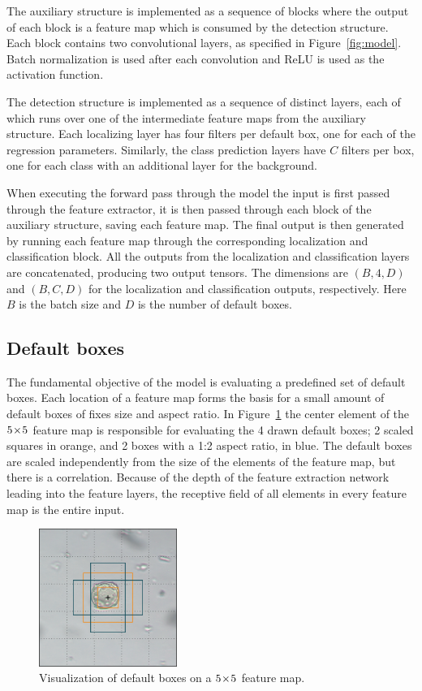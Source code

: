 The auxiliary structure is implemented as a sequence of blocks where the output of each block is a feature map which is consumed by the detection structure.
Each block contains two convolutional layers, as specified in Figure~\ref{fig:model}.
Batch normalization is used after each convolution and ReLU is used as the activation function.

The detection structure is implemented as a sequence of distinct layers, each of which runs over one of the intermediate feature maps from the auxiliary structure.
Each localizing layer has four filters per default box, one for each of the regression parameters.
Similarly, the class prediction layers have \(C\) filters per box, one for each class with an additional layer for the background.

When executing the forward pass through the model the input is first passed through the feature extractor, it is then passed through each block of the auxiliary structure, saving each feature map.
The final output is then generated by running each feature map through the corresponding localization and classification block.
All the outputs from the localization and classification layers are concatenated, producing two output tensors.
The dimensions are \(\left(B,4,D\right) \) and \(\left(B,C,D\right) \) for the localization and classification outputs, respectively.
Here \(B\) is the batch size and \(D\) is the number of default boxes.

\subsection{Default boxes}

The fundamental objective of the model is evaluating a predefined set of default boxes.
Each location of a feature map forms the basis for a small amount of default boxes of fixes size and aspect ratio.
In Figure~\ref{fig:defaults} the center element of the \(5\!\times \! 5\) feature map is responsible for evaluating the 4 drawn default boxes; 2 scaled squares in orange, and 2 boxes with a 1:2 aspect ratio, in blue.
The default boxes are scaled independently from the size of the elements of the feature map, but there is a correlation.
Because of the depth of the feature extraction network leading into the feature layers, the receptive field of all elements in every feature map is the entire input.%
\begin{figure}
  \centering
  \includegraphics[width=0.4\textwidth]{figs/default_boxes}
  \caption[Visualizing default boxes]{Visualization of default boxes on a \(5\!\times \! 5 \) feature map.}\label{fig:defaults}
\end{figure}

